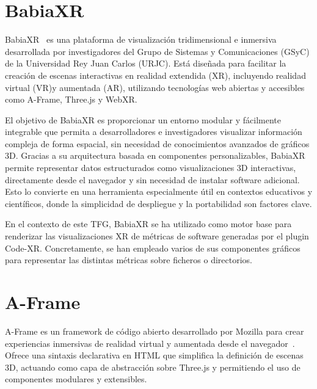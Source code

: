 \documentclass[a4paper, 12pt]{book}
\begin{document}
\section{BabiaXR}
\label{sec:babiaxr}

BabiaXR~\cite{moreno2022babiaxr} es una plataforma de visualización tridimensional e inmersiva desarrollada por investigadores del Grupo de Sistemas y Comunicaciones (GSyC) de la Universidad Rey Juan Carlos (URJC). Está diseñada para facilitar la creación de escenas interactivas en realidad extendida (XR), incluyendo realidad virtual (VR)y aumentada (AR), utilizando tecnologías web abiertas y accesibles como A-Frame, Three.js y WebXR.

El objetivo de BabiaXR es proporcionar un entorno modular y fácilmente integrable que permita a desarrolladores e investigadores visualizar información compleja de forma espacial, sin necesidad de conocimientos avanzados de gráficos 3D. Gracias a su arquitectura basada en componentes personalizables, BabiaXR permite representar datos estructurados como visualizaciones 3D interactivas, directamente desde el navegador y sin necesidad de instalar software adicional. Esto lo convierte en una herramienta especialmente útil en contextos educativos y científicos, donde la simplicidad de despliegue y la portabilidad son factores clave.

En el contexto de este TFG, BabiaXR se ha utilizado como motor base para renderizar las visualizaciones XR de métricas de software generadas por el plugin Code-XR. Concretamente, se han empleado varios de sus componentes gráficos para representar las distintas métricas sobre ficheros o directorios.


\section{A-Frame}
\label{sec:aframe}

A-Frame es un framework de código abierto desarrollado por Mozilla para crear experiencias inmersivas de realidad virtual y aumentada desde el navegador~\cite{aframe}. Ofrece una sintaxis declarativa en HTML que simplifica la definición de escenas 3D, actuando como capa de abstracción sobre Three.js y permitiendo el uso de componentes modulares y extensibles.  
\end{document}
